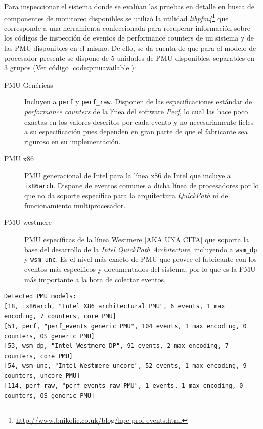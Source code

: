 Para inspeccionar el sistema donde se evalúan las pruebas en detalle en busca de componentes de monitoreo disponibles se utilizó la utilidad \emph{libpfm4}\footnote{\url{http://www.bnikolic.co.uk/blog/hpc-prof-events.html}} que corresponde a una herramienta confeccionada para recuperar información sobre los códigos de inspección de eventos de performance counters de un sistema y de las PMU disponibles en el mismo. De ello, se da cuenta de que para el modelo de procesador presente se dispone de 5 unidades de PMU disponibles, separables en 3 grupos (Ver código \ref{code:pmuavailable}):
\begin{description}
\item[PMU Genéricas] Incluyen a \verb=perf= y  \verb=perf_raw=. Disponen de las especificaciones estándar de \emph{performance counters} de la línea del software \emph{Perf}, lo cual las hace poco exactas en los valores descritos por cada evento y no necesariamente fieles a su especificación pues dependen en gran parte de que el fabricante sea riguroso en su implementación.
\item[PMU x86] PMU generacional de Intel para la línea x86 de Intel que incluye a \verb=ix86arch=. Dispone de eventos comunes a dicha línea de procesadores por lo que no da soporte específico para la arquitectura \emph{QuickPath} ni del funcionamiento multiprocesador.
\item[PMU westmere] PMU específicas de la línea Westmere [AKA UNA CITA] que soporta la base del desarrollo de la \emph{Intel QuickPath Architecture}, incluyendo a \verb=wsm_dp= y \verb=wsm_unc=. Es el nivel más exacto de PMU que provee el fabricante con los eventos más especificos y documentados del sistema, por lo que es la PMU más importante a la hora de colectar eventos.
\end{description}

\begin{lstlisting}[style=BashInputStyle, label={code:pmuavailable}, caption={Listado de \emph{PMUs} disponibles en el sistema, recuperado con la herramienta \emph{libpfm4}.}, captionpos=b]
	Detected PMU models:
[18, ix86arch, "Intel X86 architectural PMU", 6 events, 1 max encoding, 7 counters, core PMU]
[51, perf, "perf_events generic PMU", 104 events, 1 max encoding, 0 counters, OS generic PMU]
[53, wsm_dp, "Intel Westmere DP", 91 events, 2 max encoding, 7 counters, core PMU]
[54, wsm_unc, "Intel Westmere uncore", 52 events, 1 max encoding, 9 counters, uncore PMU]
[114, perf_raw, "perf_events raw PMU", 1 events, 1 max encoding, 0 counters, OS generic PMU]
\end{lstlisting}

